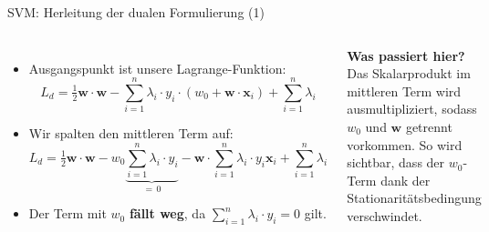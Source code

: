 \begin{frame}{SVM: Herleitung der dualen Formulierung (1)}
\begin{columns}

\footnotesize
\begin{itemize}
  \item Ausgangspunkt ist unsere Lagrange-Funktion:
        \[
          L_d = \tfrac{1}{2}\mathbf{w}\cdot\mathbf{w}
          - \sum_{i=1}^{n}\lambda_i \cdot y_i \cdot (w_0 + \mathbf{w}\cdot\mathbf{x}_i)
          + \sum_{i=1}^{n}\lambda_i
        \]
  \item Wir spalten den mittleren Term auf:
        \[
          L_d = \tfrac{1}{2}\mathbf{w}\cdot\mathbf{w}
          - w_0 \underbrace{\sum_{i=1}^{n}\lambda_i \cdot y_i}_{=\,0}
          - \mathbf{w}\cdot\sum_{i=1}^{n}\lambda_i \cdot y_i \mathbf{x}_i
          + \sum_{i=1}^{n}\lambda_i
        \]
  \item Der Term mit $w_0$ \textbf{fällt weg}, da
        $\sum_{i=1}^{n}\lambda_i \cdot y_i = 0$ gilt.
\end{itemize}

\footnotesize
\textbf{Was passiert hier?} Das Skalarprodukt im mittleren Term wird
ausmultipliziert, sodass $w_0$ und $\mathbf{w}$ getrennt vorkommen. So wird
sichtbar, dass der $w_0$-Term dank der Stationaritätsbedingung
verschwindet.
\end{columns}
\end{frame}

